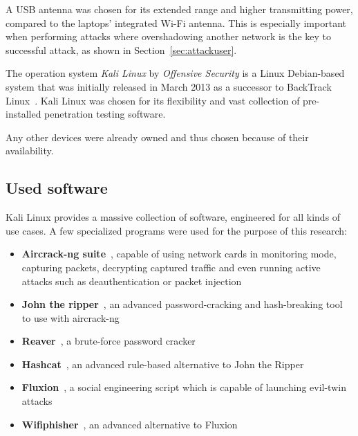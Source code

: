 A USB antenna was chosen for its extended range and higher transmitting power, compared to the laptops' integrated Wi-Fi antenna. This is especially important when performing attacks where overshadowing another network is the key to successful attack, as shown in Section~\ref{sec:attackuser}.

The operation system \emph{Kali Linux} by \emph{Offensive Security} is a Linux Debian-based system that was initially released in March 2013 as a successor to BackTrack Linux~\cite{OffSecDoc17}. Kali Linux was chosen for its flexibility and vast collection of pre-installed penetration testing software.

Any other devices were already owned and thus chosen because of their availability.

\subsection{Used software}

Kali Linux provides a massive collection of software, engineered for all kinds of use cases. A few specialized programs were used for the purpose of this research:

\begin{itemize}

\item{\textbf{Aircrack-ng suite}~\cite{AirNg17}, capable of using network cards in monitoring mode, capturing packets, decrypting captured traffic and even running active attacks such as deauthentication or packet injection}

\item{\textbf{John the ripper}~\cite{Openwall17}, an advanced password-cracking and hash-breaking tool to use with aircrack-ng}

\item{\textbf{Reaver}~\cite{Reaver17}, a brute-force password cracker}

\item{\textbf{Hashcat}~\cite{Steube17}, an advanced rule-based alternative to John the Ripper}

\item{\textbf{Fluxion}~\cite{Fluxion17}, a social engineering script which is capable of launching evil-twin attacks}

\item{\textbf{Wifiphisher}~\cite{Wifiphisher17}, an advanced alternative to Fluxion}

\end{itemize}

